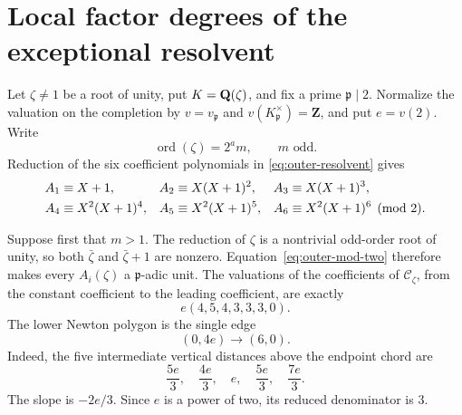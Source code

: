 \section{Local factor degrees of the exceptional resolvent}
\label{sec:outer-local}

Let $\zeta\ne1$ be a root of unity, put $K=\mathbf Q(\zeta)$, and fix a
prime $\mathfrak p\mid2$.  Normalize the valuation on the completion by
$v=v_{\mathfrak p}$ and $v(K_{\mathfrak p}^\times)=\mathbf Z$, and put
$e=v(2)$.
Write
\[
 \operatorname{ord}(\zeta)=2^a m,\qquad m\text{ odd}.
\]
Reduction of the six coefficient polynomials in
\eqref{eq:outer-resolvent} gives
\begin{align}
 A_1&\equiv X+1,&
 A_2&\equiv X(X+1)^2,&
 A_3&\equiv X(X+1)^3,\notag\\
 A_4&\equiv X^2(X+1)^4,&
 A_5&\equiv X^2(X+1)^5,&
 A_6&\equiv X^2(X+1)^6
 \pmod2.
 \label{eq:outer-mod-two}
\end{align}

Suppose first that $m>1$.  The reduction of $\zeta$ is a nontrivial
odd-order root of unity, so both $\bar\zeta$ and
$\bar\zeta+1$ are nonzero.  Equation~\eqref{eq:outer-mod-two}
therefore makes every $A_i(\zeta)$ a $\mathfrak p$-adic unit.
The valuations of the coefficients of $\mathcal C_\zeta$, from the
constant coefficient to the leading coefficient, are exactly
\begin{equation}
 e(4,5,4,3,3,3,0).
 \label{eq:outer-odd-valuations}
\end{equation}
The lower Newton polygon is the single edge
\[
 (0,4e)\longrightarrow(6,0).
\]
Indeed, the five intermediate vertical distances above the endpoint
chord are
\[
 \frac{5e}{3},\quad\frac{4e}{3},\quad e,
 \quad\frac{5e}{3},\quad\frac{7e}{3}.
\]
The slope is $-2e/3$.  Since $e$ is a power of two, its reduced
denominator is $3$.


